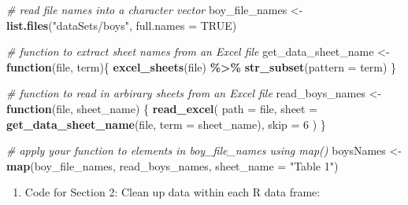 \documentclass[
]{book}
\newenvironment{Shaded}{\begin{snugshade}}{\end{snugshade}}
\newcommand{\CommentTok}[1]{\textcolor[rgb]{0.56,0.35,0.01}{\textit{#1}}}
\newcommand{\ControlFlowTok}[1]{\textcolor[rgb]{0.13,0.29,0.53}{\textbf{#1}}}
\newcommand{\DataTypeTok}[1]{\textcolor[rgb]{0.13,0.29,0.53}{#1}}
\newcommand{\DecValTok}[1]{\textcolor[rgb]{0.00,0.00,0.81}{#1}}
\newcommand{\KeywordTok}[1]{\textcolor[rgb]{0.13,0.29,0.53}{\textbf{#1}}}
\newcommand{\NormalTok}[1]{#1}
\newcommand{\OperatorTok}[1]{\textcolor[rgb]{0.81,0.36,0.00}{\textbf{#1}}}
\newcommand{\OtherTok}[1]{\textcolor[rgb]{0.56,0.35,0.01}{#1}}
\newcommand{\StringTok}[1]{\textcolor[rgb]{0.31,0.60,0.02}{#1}}
\providecommand{\tightlist}{%
  \setlength{\itemsep}{0pt}\setlength{\parskip}{0pt}}
\begin{document}
\begin{Shaded}
\begin{Highlighting}[]
\CommentTok{\# read file names into a character vector}
\NormalTok{boy\_file\_names \textless{}{-}}\StringTok{ }\KeywordTok{list.files}\NormalTok{(}\StringTok{"dataSets/boys"}\NormalTok{, }\DataTypeTok{full.names =} \OtherTok{TRUE}\NormalTok{)}

\CommentTok{\# function to extract sheet names from an Excel file}
\NormalTok{get\_data\_sheet\_name \textless{}{-}}\StringTok{ }\ControlFlowTok{function}\NormalTok{(file, term)\{}
  \KeywordTok{excel\_sheets}\NormalTok{(file) }\OperatorTok{\%\textgreater{}\%}\StringTok{ }\KeywordTok{str\_subset}\NormalTok{(}\DataTypeTok{pattern =}\NormalTok{ term)}
\NormalTok{\}}

\CommentTok{\# function to read in arbirary sheets from an Excel file}
\NormalTok{read\_boys\_names \textless{}{-}}\StringTok{ }\ControlFlowTok{function}\NormalTok{(file, sheet\_name) \{}
  \KeywordTok{read\_excel}\NormalTok{(}
    \DataTypeTok{path =}\NormalTok{ file,}
    \DataTypeTok{sheet =} \KeywordTok{get\_data\_sheet\_name}\NormalTok{(file, }\DataTypeTok{term =}\NormalTok{ sheet\_name),}
    \DataTypeTok{skip =} \DecValTok{6}
\NormalTok{  )}
\NormalTok{\}}

\CommentTok{\# apply your function to elements in \textasciigrave{}boy\_file\_names\textasciigrave{} using \textasciigrave{}map()\textasciigrave{}}
\NormalTok{boysNames \textless{}{-}}\StringTok{ }\KeywordTok{map}\NormalTok{(boy\_file\_names, read\_boys\_names, }\DataTypeTok{sheet\_name =} \StringTok{"Table 1"}\NormalTok{)}
\end{Highlighting}
\end{Shaded}

\begin{enumerate}
\def\labelenumi{\arabic{enumi}.}
\setcounter{enumi}{1}
\tightlist
\item
  Code for Section 2: Clean up data within each R data frame:
\end{enumerate}
\end{document}
